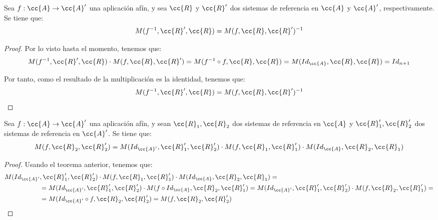 \begin{coro}
    Sea $f:\cc{A}\to \cc{A}'$ una aplicación afín, y sea $\cc{R}$ y $\cc{R}'$ dos sistemas de referencia en $\cc{A}$ y $\cc{A}'$, respectivamente. Se tiene que:
    \begin{equation*}
        M(f^{-1}, \cc{R}', \cc{R})
        = M(f, \cc{R}, \cc{R}')^{-1}
    \end{equation*}
\end{coro}
\begin{proof}
    Por lo visto hasta el momento, tenemos que:
    \begin{equation*}
        M(f^{-1}, \cc{R}', \cc{R})\cdot M(f, \cc{R}, \cc{R}') = M(f^{-1}\circ f, \cc{R}, \cc{R}) = M(Id_{\cc{A}}, \cc{R}, \cc{R}) = Id_{n+1}
    \end{equation*}

    Por tanto, como el resultado de la multiplicación es la identidad, tenemos que:
    \begin{equation*}
        M(f^{-1}, \cc{R}', \cc{R})
        = M(f, \cc{R}, \cc{R}')^{-1}
    \end{equation*}
\end{proof}

\begin{coro}
    Sea $f:\cc{A}\to \cc{A}'$ una aplicación afín, y sean $\cc{R}_1, \cc{R}_2$ dos sistemas de referencia en $\cc{A}$ y $\cc{R}'_1, \cc{R}'_2$ dos sistemas de referencia en $\cc{A}'$. Se tiene que:
    \begin{equation*}
        M(f, \cc{R}_2, \cc{R}'_2)
        = M(Id_{\cc{A}'}, \cc{R}'_1, \cc{R}'_2)\cdot
        M(f, \cc{R}_1, \cc{R}'_1)\cdot
        M(Id_{\cc{A}}, \cc{R}_2, \cc{R}_1)
    \end{equation*}
\end{coro}
\begin{proof}
    Usando el teorema anterior, tenemos que:
    \begin{equation*}\begin{split}
        M(Id_{\cc{A}'}&, \cc{R}'_1, \cc{R}'_2)\cdot
        M(f, \cc{R}_1, \cc{R}'_1)\cdot
        M(Id_{\cc{A}}, \cc{R}_2, \cc{R}_1)=\\&
        = M(Id_{\cc{A}'}, \cc{R}'_1, \cc{R}'_2)\cdot
        M(f\circ Id_{\cc{A}}, \cc{R}_2, \cc{R}_1') = M(Id_{\cc{A}'}, \cc{R}'_1, \cc{R}'_2)\cdot
        M(f, \cc{R}_2, \cc{R}_1') =\\&
        = M(Id_{\cc{A}'}\circ f, \cc{R}_2, \cc{R}'_2)
        = M(f, \cc{R}_2, \cc{R}'_2)
    \end{split}\end{equation*}
\end{proof}

